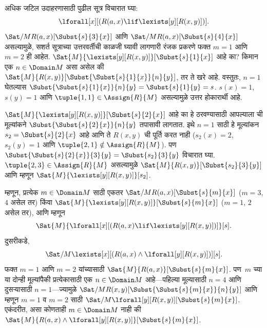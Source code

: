 \documentclass[../../../include/open-logic-section]{subfiles}
\begin{document}
\begin{ex}
अधिक जटिल उदाहरणासाठी पुढील सूत्र विचारात घ्या:
\[
\lforall[x][(R(a,x) \lif \lexists[y][R(x,y)])].
\]
$\Sat/{M}{R(a,x)}[\Subst{s}{3}{x}]$ आणि
$\Sat/{M}{R(a,x)}[\Subst{s}{4}{x}]$ असल्यामुळे, सशर्त सूत्राच्या
उत्तरवर्तीची काळजी घ्यावी लागणारी रंजक प्रकरणे फक्त $m = 1$ आणि
$m = 2$ ही आहेत. $\Sat{M}{\lexists[y][R(x,y)]}[\Subst{s}{1}{x}]$ आहे
का? किमान एक $n \in \Domain M$ असा असेल की
$\Sat{M}{R(x,y)}[\Subst{\Subst{s}{1}{x}}{n}{y}]$, तर ते खरे आहे.
वस्तुतः, $n = 1$ घेतल्यास $\Subst{\Subst{s}{1}{x}}{n}{y} =
\Subst{s}{1}{y} = s$. $s(x) = 1$, $s(y) = 1$ आणि
$\tuple{1,1} \in \Assign{R}{M}$ असल्यामुळे उत्तर होकारार्थी आहे.

$\Sat{M}{\lexists[y][R(x,y)]}[\Subst{s}{2}{x}]$ आहे का हे ठरवण्यासाठी
आपल्याला ची मूल्यांकने
$\Subst{\Subst{s}{2}{x}}{n}{y}$ तपासावी लागतात. इथे $n = 1$ साठी हे
मूल्यांकन $s_2 = \Subst{s}{2}{x}$ आहे आणि ते $R(x,y)$ ची पूर्ति करत
नाही ($s_2(x) = 2$, $s_2(y) = 1$ आणि
$\tuple{2,1}\notin \Assign{R}{M}$). पण
$\Subst{\Subst{s}{2}{x}}{3}{y} = \Subst{s_2}{3}{y}$ विचारात घ्या.
$\tuple{2,3} \in \Assign{R}{M}$ असल्यामुळे
$\Sat{M}{R(x,y)}[\Subst{s_2}{3}{y}]$ आणि म्हणून
$\Sat{M}{\lexists[y][R(x,y)]}[s_2]$.

म्हणून, प्रत्येक $m \in \Domain M$ साठी एकतर
$\Sat/{M}{R(a,x)}[\Subst{s}{m}{x}]$ ($m = 3$, $4$ असेल तर) किंवा
$\Sat{M}{\lexists[y][R(x,y)]}[\Subst{s}{m}{x}]$ ($m = 1$, $2$ असेल तर),
आणि म्हणून
\[
\Sat{M}{\lforall[x][(R(a,x) \lif \lexists[y][R(x,y)])]}[s].
\]
दुसरीकडे,
\[
\Sat/{M}{\lexists[x][(R(a,x) \land \lforall[y][R(x,y)])]}[s].
\]
फक्त $m = 1$ आणि $m = 2$ यांच्यासाठी
$\Sat{M}{R(a,x)}[\Subst{s}{m}{x}]$. पण~$m$ च्या या दोन्ही मूल्यांपैकी
प्रत्येकासाठी एक $n \in \Domain M$ आहे---पहिल्या मूल्यासाठी $n = 4$
आणि दुसऱ्यासाठी $n = 1$---ज्यामुळे
$\Sat/{M}{R(x,y)}[\Subst{\Subst{s}{m}{x}}{n}{y}]$ आणि म्हणून $m = 1$
व $m = 2$ साठी
$\Sat/{M}{\lforall[y][R(x,y)]}[\Subst{s}{m}{x}]$. एकंदरीत, असा कोणताही
$m \in \Domain M$ नाही की
$\Sat{M}{R(a,x) \land \lforall[y][R(x,y)]}[\Subst{s}{m}{x}]$.
\end{ex}
\end{document}

